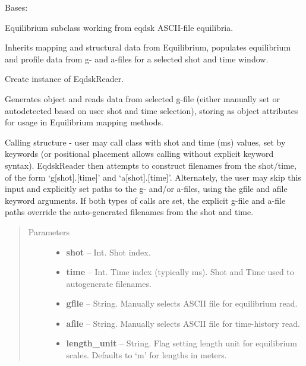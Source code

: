 \documentclass[letterpaper,10pt,english]{sphinxmanual}
\begin{document}
\begin{fulllineitems}
\label{eqtools:eqtools.eqdskreader.EqdskReader}
Bases: {\hyperref[eqtools:eqtools.core.Equilibrium]{}}

Equilibrium subclass working from eqdsk ASCII-file equilibria.

Inherits mapping and structural data from Equilibrium, populates equilibrium
and profile data from g- and a-files for a selected shot and time window.

Create instance of EqdskReader.

Generates object and reads data from selected g-file (either manually set or
autodetected based on user shot and time selection), storing as object
attributes for usage in Equilibrium mapping methods.

Calling structure - user may call class with shot and time (ms) values, set by keywords
(or positional placement allows calling without explicit keyword syntax).  EqdskReader
then attempts to construct filenames from the shot/time, of the form `g{[}shot{]}.{[}time{]}' and
`a{[}shot{]}.{[}time{]}'.  Alternately, the user may skip this input and explicitly set paths to
the g- and/or a-files, using the gfile and afile keyword arguments.  If both types of calls
are set, the explicit g-file and a-file paths override the auto-generated filenames from
the shot and time.
\begin{quote}\begin{description}
\item[{Parameters}] \leavevmode\begin{itemize}
\item {} 
\textbf{shot} -- Int.
Shot index.

\item {} 
\textbf{time} -- Int.
Time index (typically ms).  Shot and Time used to autogenerate filenames.

\item {} 
\textbf{gfile} -- String.
Manually selects ASCII file for equilibrium read.

\item {} 
\textbf{afile} -- String.
Manually selects ASCII file for time-history read.

\item {} 
\textbf{length\_unit} -- String.
Flag setting length unit for equilibrium scales.
Defaults to `m' for lengths in meters.


\end{itemize}
\end{description}
\end{quote}
\end{fulllineitems}
\end{document}
